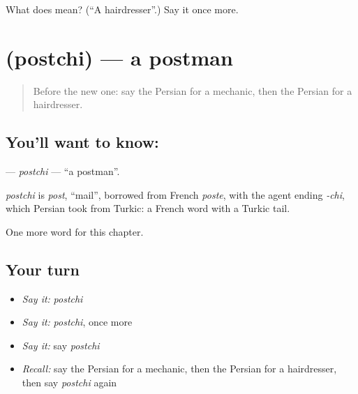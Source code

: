 \begin{tcolorbox}[breakable,colback=teal!4,colframe=teal!35!black,title={Before you move on}]
What does  mean? (\textquotedblleft{}A hairdresser\textquotedblright{}.) Say it once more.
\end{tcolorbox}
\section[\texorpdfstring{\fa{پستچی} (postchi)}{پستچی (postchi)}]{ (postchi) — a postman}

\label{lesson:FA-C284-postchi}



\begin{quote}
Before the new one: say the Persian for a mechanic, then the Persian for a hairdresser.
\end{quote}

\subsection*{You'll want to know: }
\textbf{} — \emph{postchi} — \textquotedblleft{}a postman\textquotedblright{}.

\begin{cousinweb}
\emph{postchi} is \emph{post}, \textquotedblleft{}mail\textquotedblright{}, borrowed from French \emph{poste}, with the agent ending \emph{-chi}, which Persian took from Turkic: a French word with a Turkic tail.
\end{cousinweb}

\begin{grammarlens}[title={What you've built}]
One more word for this chapter.
\end{grammarlens}

\subsection*{Your turn}
\begin{itemize}
\raggedright
  \item \emph{Say it:} \emph{postchi}
  \item \emph{Say it:} \emph{postchi}, once more
  \item \emph{Say it:} say \emph{postchi}
  \item \emph{Recall:} say the Persian for a mechanic, then the Persian for a hairdresser, then say \emph{postchi} again
\end{itemize}

